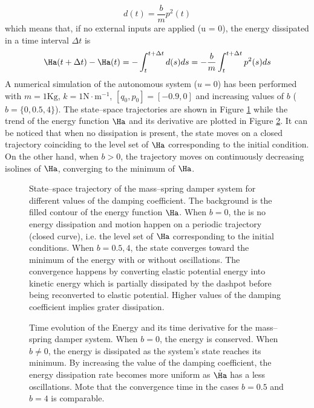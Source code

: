 \begin{exmp}
    \begin{equation}
        d(t) = \frac{b}{m}p^2(t)
    \end{equation}
    which means that, if no external inputs are applied (u = 0), the energy dissipated in a time interval $\Delta t$ is
    \begin{equation}
        \Ha(t+\Delta t) - \Ha(t) = -\int_t^{t+\Delta t}d(s)ds = -\frac{b}{m}\int_t^{t+\Delta t}p^2(s)ds
    \end{equation}
    A numerical simulation of the autonomous system ($u = 0$) has been performed with $m = 1\text{Kg}$, $k = 1\text{N}\cdot\text{m}^{-1}$, $[q_0,p_0] = [-0.9,0]$ and increasing values of $b$ ($b = \{0, 0.5, 4\}$). The state--space trajectories are shown in Figure \ref{fig:msd_ss} while the trend of the energy function $\Ha$ and its derivative are plotted in Figure \ref{fig:msd_en}. It can be noticed that when no dissipation is present, the state moves on a closed trajectory coinciding to the level set of $\Ha$ corresponding to the initial condition. On the other hand, when $b>0$, the trajectory moves on continuously decreasing isolines of $\Ha$, converging to the minimum of $\Ha$.
    \begin{figure}[!h]
        \centering
        
        \caption[State--space trajectory of the mass--spring damper system for different values of the damping coefficient.]{State--space trajectory of the mass--spring damper system for different values of the damping coefficient. The background is the filled contour of the energy function $\Ha$. When $b = 0$, the is no energy dissipation and motion happen on a periodic trajectory (closed curve), i.e. the level set of $\Ha$ corresponding to the initial conditions. When $b = 0.5, 4$, the state converges toward the minimum of the energy with or without oscillations. The convergence happens by converting elastic potential energy into kinetic energy which is partially dissipated by the dashpot before being reconverted to elastic potential. Higher values of the damping coefficient implies grater dissipation.}
        \label{fig:msd_ss}
    \end{figure}
    \begin{figure}[!h]
        \centering
        
        \caption[Time evolution of the Energy of the mass--spring damper system.]{Time evolution of the Energy and its time derivative for the mass--spring damper system. When $b=0$, the energy is conserved. When $b\neq 0$, the energy is dissipated as the system's state reaches its minimum. By increasing the value of the damping coefficient, the energy dissipation rate becomes more uniform as $\dot{\Ha}$ has a less oscillations. Mote that the convergence time in the cases $b = 0.5$ and $b = 4$ is comparable.}
        \label{fig:msd_en}
    \end{figure}
\end{exmp}
